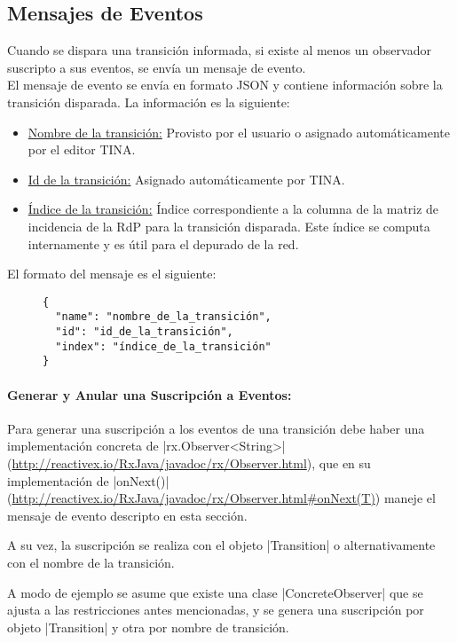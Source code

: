 \subsection{Mensajes de Eventos}
\label{mensaje_eventos}

Cuando se dispara una transición informada, si existe al menos un observador
suscripto a sus eventos, se envía un mensaje de evento.\\
El mensaje de evento se envía en formato JSON y contiene información sobre la
transición disparada. La información es la siguiente:

\begin{itemize}
    \item \underline{Nombre de la transición:} Provisto por el usuario o
    asignado automáticamente por el editor TINA.
    \item \underline{Id de la transición:} Asignado automáticamente por TINA.
    \item \underline{Índice de la transición:} Índice correspondiente a la
    columna de la matriz de incidencia de la RdP para la transición disparada.
    Este índice se computa internamente y es útil para el depurado de la red.
\end{itemize}

El formato del mensaje es el siguiente:

\begin{figure}[H]
\centering
\begin{verbatim}
{
  "name": "nombre_de_la_transición",
  "id": "id_de_la_transición",
  "index": "índice_de_la_transición"
}
\end{verbatim}
\end{figure}

\paragraph{Generar y Anular una Suscripción a Eventos:}
Para generar una suscripción a los eventos de una transición debe haber una
implementación concreta de |rx.Observer<String>|
(\url{http://reactivex.io/RxJava/javadoc/rx/Observer.html}), que en su
implementación de |onNext()| 
(\url{http://reactivex.io/RxJava/javadoc/rx/Observer.html#onNext(T)})
maneje el mensaje de evento descripto en esta sección.

A su vez, la suscripción se realiza con el objeto |Transition| o
alternativamente con el nombre de la transición.

A modo de ejemplo se asume que existe una clase |ConcreteObserver|
que se ajusta a las restricciones antes mencionadas, y se genera una suscripción por
objeto |Transition| y otra por nombre de transición.

